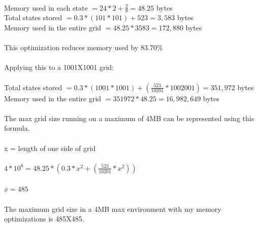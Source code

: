 \documentclass[12pt]{article}
\begin{document}
\\
Memory used in each state $= 24*2 + \frac{2}{8} = 48.25$ bytes\\
Total states stored $= 0.3 * (101*101) + 523 = 3,583$ bytes\\
Memory used in the entire grid $=48.25 * 3583 = 172,880$ bytes\\
\\
This optimization reduces memory used by 83.70\%\\
\\
Applying this to a 1001X1001 grid:\\
\\
Total states stored $= 0.3 * (1001*1001) + (\frac{523}{10201} * 1002001) = 351,972$ bytes\\
Memory used in the entire grid $= 351972 * 48.25 = 16,982,649$ bytes\\
\\
The max grid size running on a maximum of 4MB can be represented using this formula.\\
\\
x = length of one side of grid\\
\\
$4*10^{6} = 48.25 * (0.3*x^{2} + (\frac{523}{10201} * x^{2}))$\\
\\
$x = 485$\\
\\
The maximum grid size in a 4MB  max environment with my memory optimizations is 485X485.
\end{document}
